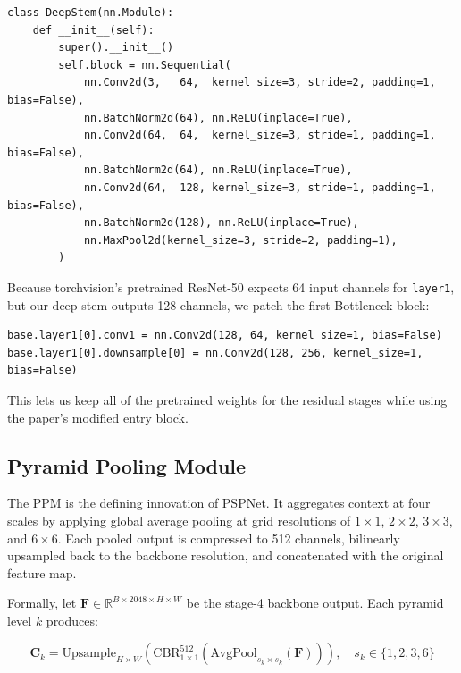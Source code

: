 \documentclass[12pt,a4paper]{article}
\newcommand{\code}[1]{\texttt{#1}}
\begin{document}
\begin{lstlisting}[caption={Deep stem implementation.}]
class DeepStem(nn.Module):
    def __init__(self):
        super().__init__()
        self.block = nn.Sequential(
            nn.Conv2d(3,   64,  kernel_size=3, stride=2, padding=1, bias=False),
            nn.BatchNorm2d(64), nn.ReLU(inplace=True),
            nn.Conv2d(64,  64,  kernel_size=3, stride=1, padding=1, bias=False),
            nn.BatchNorm2d(64), nn.ReLU(inplace=True),
            nn.Conv2d(64,  128, kernel_size=3, stride=1, padding=1, bias=False),
            nn.BatchNorm2d(128), nn.ReLU(inplace=True),
            nn.MaxPool2d(kernel_size=3, stride=2, padding=1),
        )
\end{lstlisting}

Because torchvision's pretrained ResNet-50 expects 64 input channels for
\code{layer1}, but our deep stem outputs 128 channels, we patch the first
Bottleneck block:

\begin{lstlisting}[caption={Patching \texttt{layer1} to accept 128 channels from the deep stem.}]
base.layer1[0].conv1 = nn.Conv2d(128, 64, kernel_size=1, bias=False)
base.layer1[0].downsample[0] = nn.Conv2d(128, 256, kernel_size=1, bias=False)
\end{lstlisting}

This lets us keep all of the pretrained weights for the residual stages
while using the paper's modified entry block.

\subsection{Pyramid Pooling Module}

The PPM is the defining innovation of PSPNet.  It aggregates context at four
scales by applying global average pooling at grid resolutions of $1\times1$,
$2\times2$, $3\times3$, and $6\times6$.  Each pooled output is compressed to
512 channels, bilinearly upsampled back to the backbone resolution, and
concatenated with the original feature map.

Formally, let $\mathbf{F} \in \mathbb{R}^{B \times 2048 \times H \times W}$
be the stage-4 backbone output.  Each pyramid level $k$ produces:

\[
    \mathbf{C}_k = \text{Upsample}_{H\times W}\!\left(
        \text{CBR}_{1\times1}^{512}\!\left(
            \text{AvgPool}_{s_k \times s_k}(\mathbf{F})
        \right)
    \right), \quad s_k \in \{1, 2, 3, 6\}
\]
\end{document}
